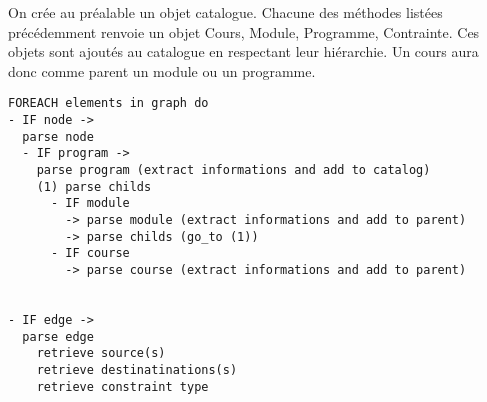On crée au préalable un objet catalogue. Chacune des méthodes listées précédemment renvoie un objet Cours, Module, Programme, Contrainte. Ces objets sont ajoutés au catalogue en respectant leur hiérarchie. Un cours aura donc comme parent un module ou un programme. 


\begin{lstlisting}
FOREACH elements in graph do
- IF node -> 
  parse node
  - IF program -> 
    parse program (extract informations and add to catalog)
    (1) parse childs
      - IF module
        -> parse module (extract informations and add to parent)
        -> parse childs (go_to (1))
      - IF course
        -> parse course (extract informations and add to parent)


- IF edge -> 
  parse edge
    retrieve source(s)
    retrieve destinatinations(s)
    retrieve constraint type
\end{lstlisting}




